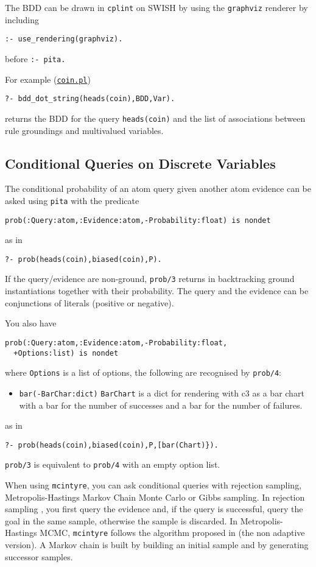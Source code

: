 The BDD can be drawn in \verb|cplint| on SWISH by using the \verb|graphviz| renderer
by including
\begin{verbatim}
:- use_rendering(graphviz).
\end{verbatim}
before \verb|:- pita.|

For example (\href{http://cplint.eu/example/inference/coin.pl}{\texttt{coin.pl}})
\begin{verbatim}
?- bdd_dot_string(heads(coin),BDD,Var).
\end{verbatim}
returns the BDD for the query \verb|heads(coin)| and the list of associations between rule groundings and
multivalued variables.


\subsection{Conditional Queries on Discrete Variables}
\label{condq}
The conditional probability of an atom query given another atom evidence can be asked using \verb|pita| with the predicate
\begin{verbatim}
prob(:Query:atom,:Evidence:atom,-Probability:float) is nondet
\end{verbatim}
as in
\begin{verbatim}
?- prob(heads(coin),biased(coin),P).
\end{verbatim}
If the query/evidence are non-ground, \verb|prob/3| returns in backtracking ground instantiations together with their probability. The query and the evidence can be conjunctions of literals (positive or negative).


You also have
\begin{verbatim}
prob(:Query:atom,:Evidence:atom,-Probability:float,
  +Options:list) is nondet
\end{verbatim}
where \verb|Options| is a list of options, the following are recognised by \verb|prob/4|:
\begin{itemize}
\item \verb|bar(-BarChar:dict)|
\verb|BarChart| is a dict for rendering with c3 as a bar chart with
a bar for the number of successes and a bar for the number
of failures.
\end{itemize}
as in
\begin{verbatim}
?- prob(heads(coin),biased(coin),P,[bar(Chart)}).
\end{verbatim}
\verb|prob/3| is equivalent to \verb|prob/4| with an empty option list. 

When using \verb|mcintyre|, you can ask conditional queries with rejection sampling, Metropolis-Hastings Markov Chain Monte Carlo or Gibbs sampling.
In rejection sampling \cite{von195113}, you first query the evidence and, if the query is successful, query the goal in the same sample, otherwise
the sample is discarded.
In Metropolis-Hastings MCMC, \verb|mcintyre| follows the algorithm proposed in \cite{nampally2014adaptive} (the non adaptive version).
A Markov chain is built by building an initial sample and by generating successor samples.

